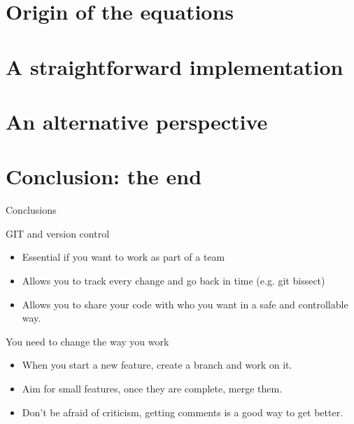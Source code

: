 \documentclass[c,11pt,xcolor=dvipsnames, aspectratio=169]{beamer}
\begin{document}
\section{Origin of the equations}


\section{A straightforward implementation}

\section{An alternative perspective}

\section{Conclusion: the end}

\begin{frame}{Conclusions}
\begin{block}{GIT and version control}
	\begin{itemize}
	\item Essential if you want to work as part of a team
	\item Allows you to track every change and go back in time (e.g. git bissect)
	\item Allows you to share your code with who you want in a safe and controllable way.
	\end{itemize}
\end{block}

\begin{block}{You need to change the way you work}
	\begin{itemize}
	\item When you start a new feature, create a branch and work on it.
	\item Aim for small features, once they are complete, merge them.
	\item Don't be afraid of criticism, getting comments is a good way to get better.
	\end{itemize}
\end{block}
\end{frame}
\end{document}
